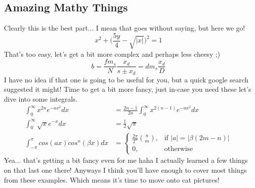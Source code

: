 \documentclass[]{article}
\begin{document}
\subsection{Amazing Mathy Things}
Clearly this is the best part... I mean that goes without saying, but here we go! 
\begin{equation}
x^2 + \bigg( \frac{5y}{4} - \sqrt{|x|} \bigg)^2 = 1
\end{equation}
That's too easy, let's get a bit more complex and perhaps less cheesy ;)
\begin{equation}
b = \frac{fm_s}{N} \frac{x_d}{s \pm x_d} = dm_s\frac{x_d}{D}
\end{equation}
I have no idea if that one is going to be useful for you, but a quick google search suggested it might! Time to get a bit more fancy, just in-case you need these let's dive into some integrals.
\begin{align}
\int_{0}^{\infty}x^{2n} e^{-ax^2} dx &= \frac{2n-1}{2a} \int_{0}^{\infty} x^{2(n-1)}e^{-ax^2} dx \\
\int_{0}^{\infty} \sqrt{x}e^{-x} dx &= \frac{1}{2}\sqrt{\pi} \\
\int_{-\pi}^{\pi} cos(ax)cos^{n}(\beta x) dx &= 
\begin{cases}
    \frac{2\pi}{2^n}\binom{n}{m},& \text{if } |a| = |\beta(2m-n)|\\
    0,              & \text{otherwise}
\end{cases}
\end{align}
Yea... that's getting a bit fancy even for me haha I actually learned a few things on that last one there! Anyways I think you'll have enough to cover most things from these examples. Which means it's time to move onto cat pictures!
\newpage 
\end{document}
